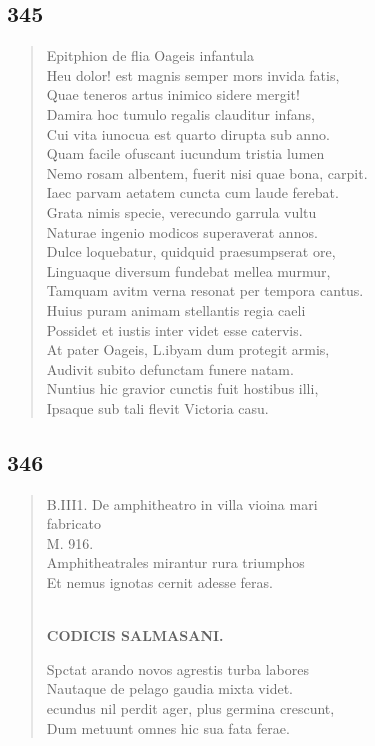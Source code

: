 \documentclass[11pt, a4paper]{report}
\begin{document}
            \subsection*{345}
      \begin{verse}
      Epitphion de flia Oageis infantula \\ Heu dolor! est magnis semper mors invida fatis, \\ Quae teneros artus inimico sidere mergit! \\ Damira hoc tumulo regalis clauditur infans, \\ Cui vita iunocua est quarto dirupta sub anno. \\ Quam facile ofuscant iucundum tristia lumen \\ Nemo rosam albentem, fuerit nisi quae bona, carpit. \\ Iaec parvam aetatem cuncta cum laude ferebat. \\ Grata nimis specie, verecundo garrula vultu \\ Naturae ingenio modicos superaverat annos. \\ Dulce loquebatur, quidquid praesumpserat ore, \\ Linguaque diversum fundebat mellea murmur, \\ Tamquam avitm verna resonat per tempora cantus. \\ Huius puram animam stellantis regia caeli \\ Possidet et iustis inter videt esse catervis. \\ At pater Oageis, L.ibyam dum protegit armis, \\ Audivit subito defunctam funere natam. \\ Nuntius hic gravior cunctis fuit hostibus illi, \\ Ipsaque sub tali flevit Victoria casu. \\ 
      \end{verse}
  
            \subsection*{346}
      \begin{verse}
      B.III1. De amphitheatro in villa vioina mari \\ fabricato \\ M. 916. \\ Amphitheatrales mirantur rura triumphos \\ Et nemus ignotas cernit adesse feras. \\ 
        ﻿\pagebreak 
    \begin{center} \textbf{CODICIS SALMASANI.} \end{center} \marginpar{[275]} Spctat arando novos agrestis turba labores \\ Nautaque de pelago gaudia mixta videt. \\ ecundus nil perdit ager, plus germina crescunt, \\ Dum metuunt omnes hic sua fata ferae. \\ 
      \end{verse}
  
\end{document}
